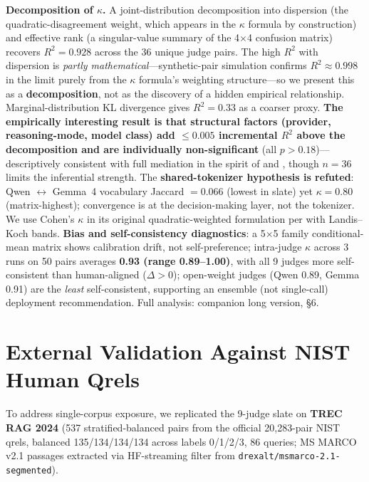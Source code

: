 \documentclass[11pt,letterpaper]{article}
\begin{document}
\textbf{Decomposition of $\kappa$.} A joint-distribution decomposition into dispersion (the quadratic-disagreement weight, which appears in the $\kappa$ formula by construction) and effective rank (a singular-value summary of the 4$\times$4 confusion matrix) recovers $R^2 = 0.928$ across the 36 unique judge pairs. The high $R^2$ with dispersion is \textit{partly mathematical}---synthetic-pair simulation confirms $R^2 \approx 0.998$ in the limit purely from the $\kappa$ formula's weighting structure---so we present this as a \textbf{decomposition}, not as the discovery of a hidden empirical relationship. Marginal-distribution KL divergence \citep{kullback1951} gives $R^2 = 0.33$ as a coarser proxy. \textbf{The empirically interesting result is that structural factors (provider, reasoning-mode, model class) add $\leq 0.005$ incremental $R^2$ above the decomposition and are individually non-significant} (all $p > 0.18$)---descriptively consistent with full mediation in the spirit of \citet{baronkenny1986} and \citet{mackinnon2007}, though $n = 36$ limits the inferential strength. The \textbf{shared-tokenizer hypothesis is refuted}: Qwen $\leftrightarrow$ Gemma~4 vocabulary Jaccard $= 0.066$ (lowest in slate) yet $\kappa = 0.80$ (matrix-highest); convergence is at the decision-making layer, not the tokenizer. We use Cohen's $\kappa$ \citep{cohen1968} in its original quadratic-weighted formulation per \citet{fleiss1971} with Landis--Koch \citep{landis1977} bands. \textbf{Bias and self-consistency diagnostics}: a 5$\times$5 family conditional-mean matrix shows calibration drift, not self-preference; intra-judge $\kappa$ across 3 runs on 50 pairs averages \textbf{0.93 (range 0.89--1.00)}, with all 9 judges more self-consistent than human-aligned ($\Delta > 0$); open-weight judges (Qwen 0.89, Gemma 0.91) are the \textit{least} self-consistent, supporting an ensemble (not single-call) deployment recommendation. Full analysis: companion long version, \S6.

\section{External Validation Against NIST Human Qrels}\label{sec:validation}

To address single-corpus exposure, we replicated the 9-judge slate on \textbf{TREC RAG 2024} \citep{macavaney2025trec_rag} (537 stratified-balanced pairs from the official 20{,}283-pair NIST qrels, balanced 135/134/134/134 across labels 0/1/2/3, 86 queries; MS MARCO v2.1 passages extracted via HF-streaming filter from \texttt{drexalt/msmarco-2.1-segmented}).
\end{document}
